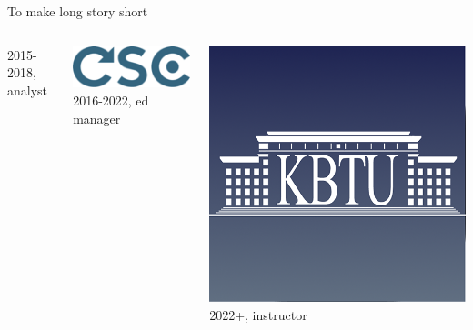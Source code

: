 \documentclass[fullscreen=true, bookmarks=true, hyperref={pdfencoding=unicode}]{beamer}
\begin{document}
\begin{frame}{To make long story short}
\begin{columns}
\begin{column}{.15\paperwidth}
      2015-2018, analyst
    \end{column}
    \begin{column}{.15\paperwidth}
      \includegraphics[keepaspectratio,       width=.15\paperwidth]{csc.png}
      2016-2022, ed manager
      \vspace{3cm}
    \end{column}
    \begin{column}{.15\paperwidth}
      \includegraphics[keepaspectratio,       width=.12\paperwidth]{kbtu.png}
      2022+, instructor


\end{column}
\end{columns}
\end{frame}
\end{document}
